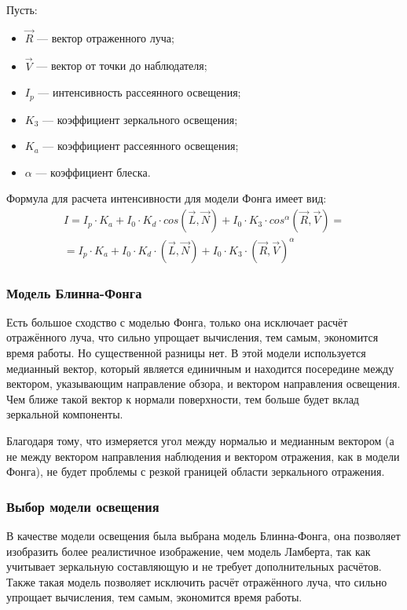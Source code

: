 Пусть:
\begin{itemize}
	\item $\overrightarrow R$ --- вектор отраженного луча;
	\item $\overrightarrow V$ --- вектор от точки до наблюдателя;
	\item $I_p$ --- интенсивность рассеянного освещения;
	\item $K_3$ --- коэффициент зеркального освещения;
	\item $K_a$ --- коэффициент рассеянного освещения;
	\item $\alpha$ --- коэффициент блеска.
\end{itemize}
 
Формула для расчета интенсивности для модели Фонга имеет вид:
\begin{equation}
	\label{eq:lambert}
	\begin{aligned}
		I = I_p \cdot K_a  + I_0 \cdot K_d \cdot cos(\overrightarrow L, \overrightarrow N) + I_0 \cdot K_3 \cdot cos^{\alpha}(\overrightarrow R, \overrightarrow V) = \\ = I_p \cdot K_a  + I_0 \cdot K_d \cdot (\overrightarrow L, \overrightarrow N) + I_0 \cdot K_3 \cdot (\overrightarrow R, \overrightarrow V)^{\alpha} 
	\end{aligned}
\end{equation}

\subsubsection{Модель Блинна-Фонга}

Есть большое сходство с моделью Фонга, только она исключает расчёт отражённого луча, что сильно упрощает вычисления, тем самым, экономится время работы.
Но существенной разницы нет.
В этой модели используется медианный вектор, который является единичным и находится посередине между вектором, указывающим направление обзора, и вектором направления освещения.
Чем ближе такой вектор к нормали поверхности, тем больше будет вклад зеркальной компоненты.

Благодаря тому, что измеряется угол между нормалью и медианным вектором (а не между вектором направления наблюдения и вектором отражения, как в модели Фонга), не будет проблемы с резкой границей области зеркального отражения.

\subsubsection{Выбор модели освещения}
В качестве модели освещения была выбрана модель Блинна-Фонга, она позволяет изобразить более реалистичное изображение, чем модель Ламберта, так как учитывает зеркальную составляющую и не требует дополнительных расчётов.
Также такая модель позволяет исключить расчёт отражённого луча, что сильно упрощает вычисления, тем самым, экономится время работы.
